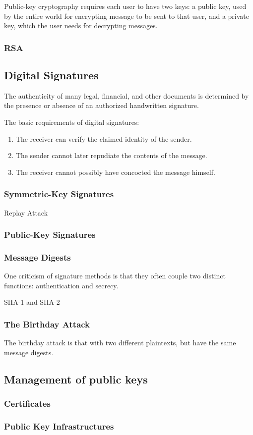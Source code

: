 Public-key cryptography requires each user to have two keys: a public key, used by the entire world for encrypting message to be sent to that user, and a private key, which the user needs for decrypting messages.

\subsubsection{RSA}%

\subsection{Digital Signatures}
The authenticity of many legal, financial, and other
documents is determined by the presence or absence of an
authorized handwritten signature.

The basic requirements of digital signatures:
\begin{enumerate}
    \item The receiver can verify the claimed identity of the sender.
    \item The sender cannot later repudiate the contents of the message.
    \item The receiver cannot possibly have concocted the message
    himself.
\end{enumerate}

\subsubsection{Symmetric-Key Signatures}


Replay Attack


\subsubsection{Public-Key Signatures}


\subsubsection{Message Digests}
One criticism of signature methods is that they often couple two
distinct functions: authentication and secrecy. 


SHA-1 and SHA-2


\subsubsection{The Birthday Attack}
The birthday attack is that with two different plaintexts, but
have the same message digests.


\subsection{Management of public keys}
\subsubsection{Certificates}

\subsubsection{Public Key Infrastructures}
